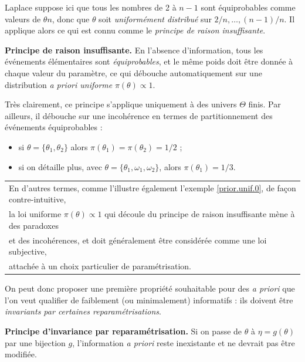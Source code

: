  Laplace suppose ici que tous les nombres de 2 à $n-1$ sont équiprobables comme valeurs de $\theta n$, donc que $\theta$ soit {\it uniformément distribué} sur $2/n,\ldots,(n-1)/n$. Il applique alors ce qui est connu comme le \emph{principe de raison insuffisante}. 
 
 \begin{definition}{\bf Principe de raison insuffisante.}
 En l'absence d'information, tous les événements élémentaires sont {\it équiprobables}, et le même poids doit être donnée à chaque valeur du paramètre, ce qui débouche automatiquement sur une distribution {\it a priori uniforme} $\pi(\theta)\propto 1$. 
 \end{definition}
 
 Très clairement, ce principe s'applique uniquement à des univers $\Theta$ finis. Par ailleurs, il débouche sur une incohérence en termes de partitionnement des événements équiprobables :
 \begin{itemize}
\item si $\theta=\{\theta_1,\theta_2\}$ alors $\pi(\theta_1)=\pi(\theta_2)=1/2$ ; 
\item si on détaille plus, avec $\theta=\{\theta_1,\omega_1,\omega_2\}$, alors $\pi(\theta_1)=1/3$. 
\end{itemize}

\begin{tabular}{|l|}
\hline
En d'autres termes, comme l'illustre également l'exemple \ref{prior.unif.0}, de fa\c con contre-intuitive, \\
la loi uniforme $\pi(\theta)\propto 1$ qui découle du principe de raison insuffisante mène à des paradoxes \\
et des incohérences, et doit généralement être considérée comme une loi subjective, \\ attachée à un choix particulier de paramétrisation. \\
\hline
\end{tabular}

\vspace{0.5cm}

On peut donc proposer une première propriété souhaitable pour des {\it a priori} que l'on veut qualifier de faiblement (ou minimalement) informatifs : ils doivent être \emph{invariants par certaines reparamétrisations}. 

\begin{definition}{\bf Principe d'invariance par reparamétrisation.}\label{principe.invariance}
Si on passe de $\theta$ à $\eta=g(\theta)$ par une bijection $g$, l'information {\it a priori} reste inexistante et ne devrait pas être modifiée. 
\end{definition}

